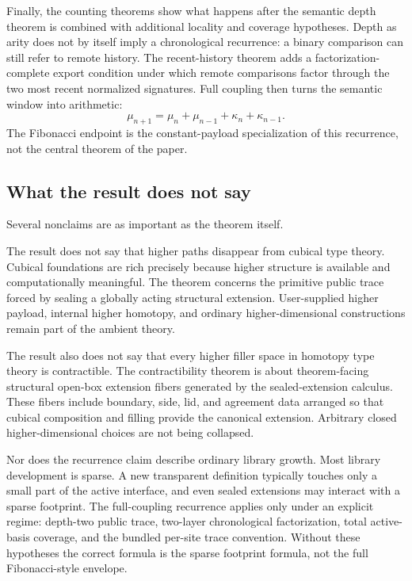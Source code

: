 Finally, the counting theorems show what happens after the semantic depth theorem is combined
with additional locality and coverage hypotheses.  Depth as arity does not by itself imply a
chronological recurrence: a binary comparison can still refer to remote history.  The
recent-history theorem adds a factorization-complete export condition under which remote
comparisons factor through the two most recent normalized signatures.  Full coupling then
turns the semantic window into arithmetic:
\[
  \mu_{n+1}
  =
  \mu_n + \mu_{n-1} + \kappa_n + \kappa_{n-1}.
\]
The Fibonacci endpoint is the constant-payload specialization of this recurrence, not the
central theorem of the paper.

\subsection{What the result does not say}
\label{subsec:conclusion-nonclaims}

Several nonclaims are as important as the theorem itself.

The result does not say that higher paths disappear from cubical type theory.  Cubical
foundations are rich precisely because higher structure is available and computationally
meaningful.  The theorem concerns the primitive public trace forced by sealing a globally
acting structural extension.  User-supplied higher payload, internal higher homotopy, and
ordinary higher-dimensional constructions remain part of the ambient theory.

The result also does not say that every higher filler space in homotopy type theory is
contractible.  The contractibility theorem is about theorem-facing structural open-box
extension fibers generated by the sealed-extension calculus.  These fibers include boundary,
side, lid, and agreement data arranged so that cubical composition and filling provide the
canonical extension.  Arbitrary closed higher-dimensional choices are not being collapsed.

Nor does the recurrence claim describe ordinary library growth.  Most library development is
sparse.  A new transparent definition typically touches only a small part of the active
interface, and even sealed extensions may interact with a sparse footprint.  The full-coupling
recurrence applies only under an explicit regime: depth-two public trace, two-layer
chronological factorization, total active-basis coverage, and the bundled per-site trace
convention.  Without these hypotheses the correct formula is the sparse footprint formula,
not the full Fibonacci-style envelope.

